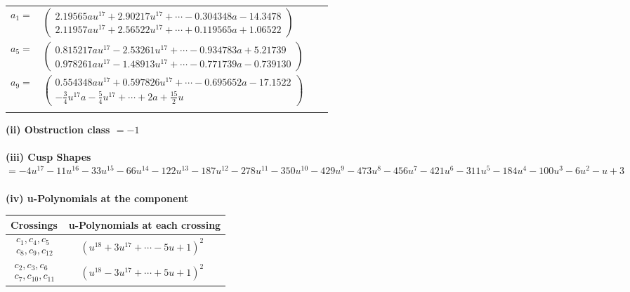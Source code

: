 \documentclass[1p]{elsarticle_modified}
\theoremstyle{definition}
\begin{document}
\begin{tabular}{m{7pt} m{180pt} m{7pt} m{180pt} }
\flushright $a_{1}=$&$\begin{pmatrix}2.19565 a u^{17}+2.90217 u^{17}+\cdots-0.304348 a-14.3478\\2.11957 a u^{17}+2.56522 u^{17}+\cdots+0.119565 a+1.06522\end{pmatrix}$ \\
\flushright $a_{5}=$&$\begin{pmatrix}0.815217 a u^{17}-2.53261 u^{17}+\cdots-0.934783 a+5.21739\\0.978261 a u^{17}-1.48913 u^{17}+\cdots-0.771739 a-0.739130\end{pmatrix}$ \\
\flushright $a_{9}=$&$\begin{pmatrix}0.554348 a u^{17}+0.597826 u^{17}+\cdots-0.695652 a-17.1522\\-\frac{3}{4} u^{17} a-\frac{5}{4} u^{17}+\cdots+2 a+\frac{15}{2} u\end{pmatrix}$\\&\end{tabular}
\flushleft \textbf{(ii) Obstruction class $= -1$}\\~\\
\flushleft \textbf{(iii) Cusp Shapes $= -4 u^{17}-11 u^{16}-33 u^{15}-66 u^{14}-122 u^{13}-187 u^{12}-278 u^{11}-350 u^{10}-429 u^9-473 u^8-456 u^7-421 u^6-311 u^5-184 u^4-100 u^3-6 u^2- u+3$}\\~\\
\newpage\renewcommand{\arraystretch}{1}
\flushleft \textbf{(iv) u-Polynomials at the component}\newline \\
\begin{tabular}{m{50pt}|m{274pt}}
Crossings & \hspace{64pt}u-Polynomials at each crossing \\
\hline $$\begin{aligned}c_{1},c_{4},c_{5}\\c_{8},c_{9},c_{12}\end{aligned}$$&$\begin{aligned}
&(u^{18}+3 u^{17}+\cdots-5 u+1)^{2}
\end{aligned}$\\
\hline $$\begin{aligned}c_{2},c_{3},c_{6}\\c_{7},c_{10},c_{11}\end{aligned}$$&$\begin{aligned}
&(u^{18}-3 u^{17}+\cdots+5 u+1)^{2}
\end{aligned}$\\
\hline
\end{tabular}\\~\\
\end{document}
